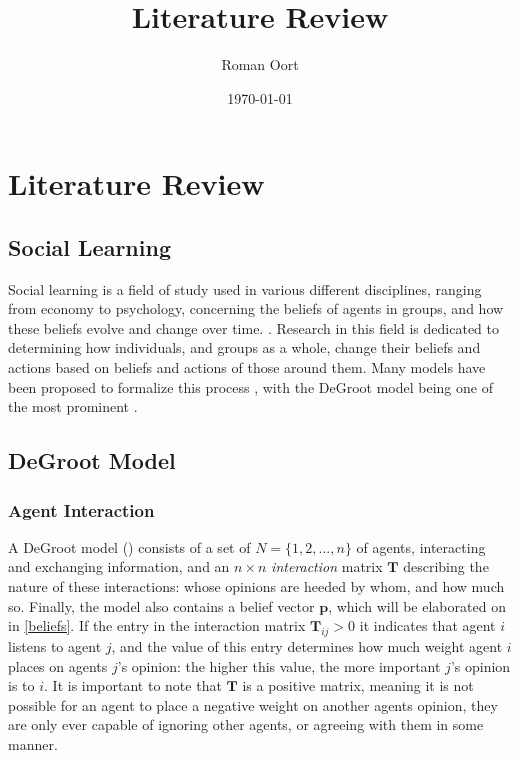 \documentclass{article}
\title{Literature Review}
\author{Roman Oort}
\date{\today}
\newcommand{\T}{\textbf{T}}
\newcommand{\Tij}{\textbf{T}_{ij}}
\begin{document}
\maketitle

\tableofcontents

\newpage

\section{Literature Review}
\subsection{Social Learning}
Social learning is a field of study used in various different disciplines, ranging from economy to psychology, concerning the beliefs of agents in groups, and how these beliefs evolve and change over time. \cite{reed2010sociallearning}. Research in this field is dedicated to determining how individuals, and groups as a whole, change their beliefs and actions based on beliefs and actions of those around them. Many models have been proposed to formalize this process \cite{golub2017learning}, with the DeGroot model being one of the most prominent \cite{degroot1974concensus}.

\subsection{DeGroot Model}
\subsubsection{Agent Interaction}
A DeGroot model (\cite{degroot1974concensus}) consists of a set of $N=\{1, 2, ..., n\}$ of agents, interacting and exchanging information, and an $n \times n$ \emph{interaction} matrix $\T$ describing the nature of these interactions: whose opinions are heeded by whom, and how much so. Finally, the model also contains a belief vector $\textbf{p}$, which will be elaborated on in \ref{beliefs}. If the entry in the interaction matrix $\Tij > 0$ it indicates that agent $i$ listens to agent $j$, and the value of this entry determines how much weight agent $i$ places on agents $j$'s opinion: the higher this value, the more important $j$'s opinion is to $i$. It is important to note that $\T$ is a positive matrix, meaning it is not possible for an agent to place a negative weight on another agents opinion, they are only ever capable of ignoring other agents, or agreeing with them in some manner. 
\end{document}
